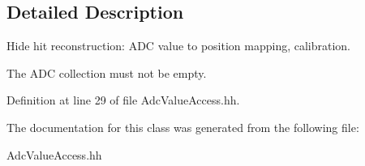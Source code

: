 \subsection{Detailed Description}
Hide hit reconstruction\-: A\-D\-C value to position mapping, calibration. 

The A\-D\-C collection must not be empty. 

Definition at line 29 of file Adc\-Value\-Access.\-hh.



The documentation for this class was generated from the following file\-:\begin{DoxyCompactItemize}
\item 
Adc\-Value\-Access.\-hh\end{DoxyCompactItemize}
